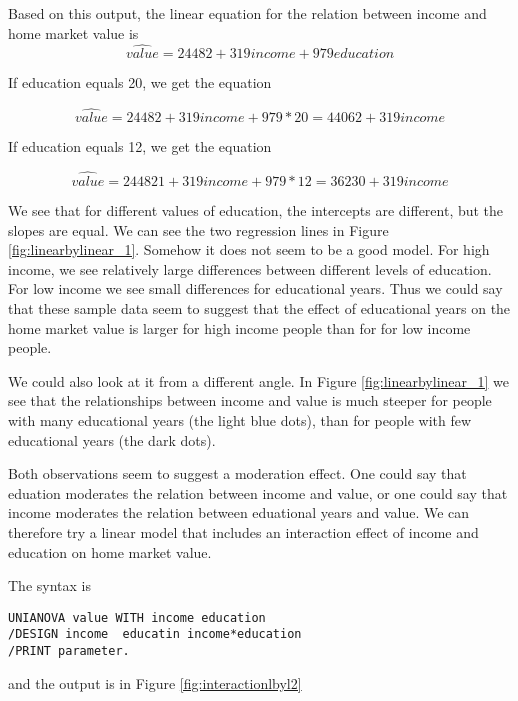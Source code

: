 Based on this output, the linear equation for the relation between income and home market value is 
\begin{equation}
\widehat{value}= 24482 + 319 income + 979 education
\end{equation}

If education equals 20, we get the equation

\begin{equation}
\widehat{value}= 24482 + 319 income + 979 * 20 = 44062 + 319 income
\end{equation}

If education equals 12, we get the equation 

\begin{equation}
\widehat{value}= 244821 + 319 income + 979 * 12 = 36230 + 319 income
\end{equation}

We see that for different values of education, the intercepts are different, but the slopes are equal. We can see the two regression lines in Figure \ref{fig:linearbylinear_1}. Somehow it does not seem to be a good model. For high income, we see relatively large differences between different levels of education. For low income we see small differences for educational years. Thus we could say that these sample data seem to suggest that the effect of educational years on the home market value is larger for high income people than for for low income people.

We could also look at it from a different angle. In Figure \ref{fig:linearbylinear_1} we see that the relationships between income and value is much steeper for people with many educational years (the light blue dots), than for people with few educational years (the dark dots).

Both observations seem to suggest a moderation effect. One could say that eduation moderates the relation between income and value, or one could say that income moderates the relation between eduational years and value. We can therefore try a linear model that includes an interaction effect of income and education on home market value. 

The syntax is 

\begin{verbatim}
UNIANOVA value WITH income education
/DESIGN income  educatin income*education
/PRINT parameter.
\end{verbatim}

and the output is in Figure \ref{fig:interactionlbyl2}

